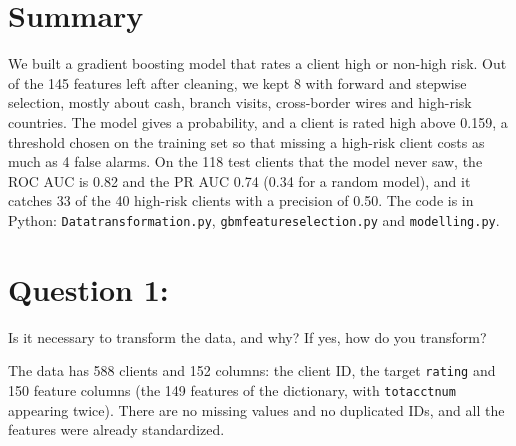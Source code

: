 \documentclass[12pt]{article}
\renewcommand{\_}{\textunderscore\allowbreak}
\begin{document}


\section*{Summary}

We built a gradient boosting model that rates a client high or non-high risk. Out of the 145 features left after cleaning, we kept 8 with forward and stepwise selection, mostly about cash, branch visits, cross-border wires and high-risk countries. The model gives a probability, and a client is rated high above 0.159, a threshold chosen on the training set so that missing a high-risk client costs as much as 4 false alarms. On the 118 test clients that the model never saw, the ROC AUC is 0.82 and the PR AUC 0.74 (0.34 for a random model), and it catches 33 of the 40 high-risk clients with a precision of 0.50. The code is in Python: \texttt{Data\_transformation.py}, \texttt{gbm\_feature\_selection.py} and \texttt{modelling.py}.

\section*{Question 1:}

\begin{question}
Is it necessary to transform the data, and why? If yes, how do you transform?
\end{question}

The data has 588 clients and 152 columns: the client ID, the target \texttt{rating} and 150 feature columns (the 149 features of the dictionary, with \texttt{tot\_acct\_num} appearing twice). There are no missing values and no duplicated IDs, and all the features were already standardized.
\end{document}

